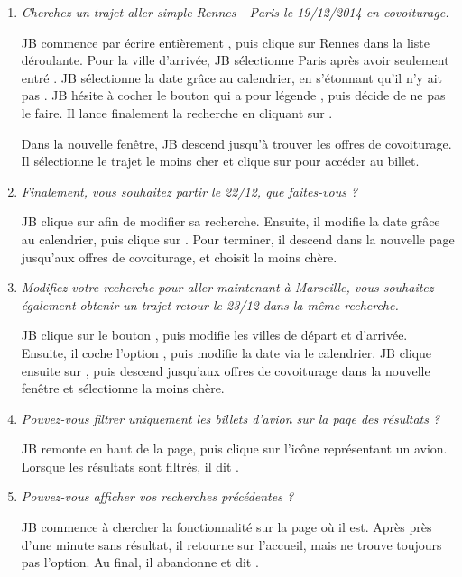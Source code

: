 \begin{enumerate}
\item \textit{Cherchez un trajet aller simple Rennes - Paris le 19/12/2014 en covoiturage.}

JB commence par \'{e}crire enti\`{e}rement , puis clique sur Rennes dans la liste d\'{e}roulante. Pour la ville d'arriv\'{e}e, JB s\'{e}lectionne Paris apr\`{e}s avoir seulement entr\'{e} .
JB s\'{e}lectionne la date gr\^{a}ce au calendrier, en s'\'{e}tonnant qu'il n'y ait pas .
JB h\'{e}site \`{a} cocher le bouton qui a pour l\'{e}gende , puis d\'{e}cide de ne pas le faire.
Il lance finalement la recherche en cliquant sur .

Dans la nouvelle fen\^{e}tre, JB descend jusqu'\`{a} trouver les offres de covoiturage. Il s\'{e}lectionne le trajet le moins cher et clique sur  pour acc\'{e}der au billet.



\item \textit{Finalement, vous souhaitez partir le 22/12, que faites-vous ?} 

JB clique sur  afin de modifier sa recherche. Ensuite, il modifie la date gr\^{a}ce au calendrier, puis clique sur . Pour terminer, il descend dans la nouvelle page jusqu'aux offres de covoiturage, et choisit la moins ch\`{e}re.


\item \textit{Modifiez votre recherche pour aller maintenant \`{a} Marseille, vous souhaitez \'{e}galement obtenir
un trajet retour le 23/12 dans la m\^{e}me recherche.}

JB clique sur le bouton , puis modifie les villes de d\'{e}part et d'arriv\'{e}e. Ensuite, il coche l'option , puis modifie la date via le calendrier. JB clique ensuite sur , puis descend jusqu'aux offres de covoiturage dans la nouvelle fen\^{e}tre et s\'{e}lectionne la moins ch\`{e}re.


\item \textit{Pouvez-vous filtrer uniquement les billets d'avion sur la page des r\'{e}sultats ?}

JB remonte en haut de la page, puis clique sur l'ic\^{o}ne repr\'{e}sentant un avion. Lorsque les r\'{e}sultats sont filtr\'{e}s, il dit .

\item \textit{Pouvez-vous afficher vos recherches pr\'{e}c\'{e}dentes ?}

JB commence \`{a} chercher la fonctionnalit\'{e} sur la page o\`{u} il est. Apr\`{e}s pr\`{e}s d'une minute sans r\'{e}sultat, il retourne sur l'accueil, mais ne trouve toujours pas l'option. Au final, il abandonne et dit .


\end{enumerate}

